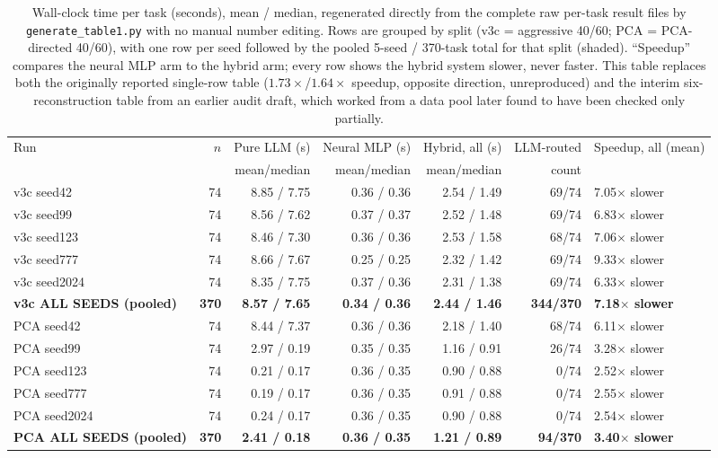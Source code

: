 \begin{table}[htbp]
\centering
\small
\caption{Wall-clock time per task (seconds), mean / median, regenerated
directly from the complete raw per-task result files by
\texttt{generate\_table1.py} with no manual number editing. Rows are
grouped by split (v3c = aggressive 40/60; PCA = PCA-directed 40/60), with
one row per seed followed by the pooled 5-seed / 370-task total for that
split (shaded). ``Speedup'' compares the neural MLP arm to the hybrid
arm; every row shows the hybrid system slower, never faster. This table
replaces both the originally reported single-row table
($1.73\times$/$1.64\times$ speedup, opposite direction, unreproduced) and
the interim six-reconstruction table from an earlier audit draft, which
worked from a data pool later found to have been checked only partially.}
\label{tab:timing_full}
\begin{tabular}{lrrrrrl}
\toprule
Run & $n$ & Pure LLM (s) & Neural MLP (s) & Hybrid, all (s) & LLM-routed & Speedup, all (mean) \\
    &     & mean/median  & mean/median    & mean/median      & count      &  \\
\midrule
v3c seed42  & 74 & 8.85 / 7.75 & 0.36 / 0.36 & 2.54 / 1.49 & 69/74 & 7.05$\times$ slower \\
v3c seed99  & 74 & 8.56 / 7.62 & 0.37 / 0.37 & 2.52 / 1.48 & 69/74 & 6.83$\times$ slower \\
v3c seed123 & 74 & 8.46 / 7.30 & 0.36 / 0.36 & 2.53 / 1.58 & 68/74 & 7.06$\times$ slower \\
v3c seed777 & 74 & 8.66 / 7.67 & 0.25 / 0.25 & 2.32 / 1.42 & 69/74 & 9.33$\times$ slower \\
v3c seed2024 & 74 & 8.35 / 7.75 & 0.37 / 0.36 & 2.31 / 1.38 & 69/74 & 6.33$\times$ slower \\
\rowcolor{black!8}
\textbf{v3c ALL SEEDS (pooled)} & \textbf{370} & \textbf{8.57 / 7.65} & \textbf{0.34 / 0.36} & \textbf{2.44 / 1.46} & \textbf{344/370} & \textbf{7.18$\times$ slower} \\
PCA seed42  & 74 & 8.44 / 7.37 & 0.36 / 0.36 & 2.18 / 1.40 & 68/74 & 6.11$\times$ slower \\
PCA seed99  & 74 & 2.97 / 0.19 & 0.35 / 0.35 & 1.16 / 0.91 & 26/74 & 3.28$\times$ slower \\
PCA seed123 & 74 & 0.21 / 0.17 & 0.36 / 0.35 & 0.90 / 0.88 & 0/74  & 2.52$\times$ slower \\
PCA seed777 & 74 & 0.19 / 0.17 & 0.36 / 0.35 & 0.91 / 0.88 & 0/74  & 2.55$\times$ slower \\
PCA seed2024 & 74 & 0.24 / 0.17 & 0.36 / 0.35 & 0.90 / 0.88 & 0/74 & 2.54$\times$ slower \\
\rowcolor{black!8}
\textbf{PCA ALL SEEDS (pooled)} & \textbf{370} & \textbf{2.41 / 0.18} & \textbf{0.36 / 0.35} & \textbf{1.21 / 0.89} & \textbf{94/370} & \textbf{3.40$\times$ slower} \\
\bottomrule
\end{tabular}
\end{table}

